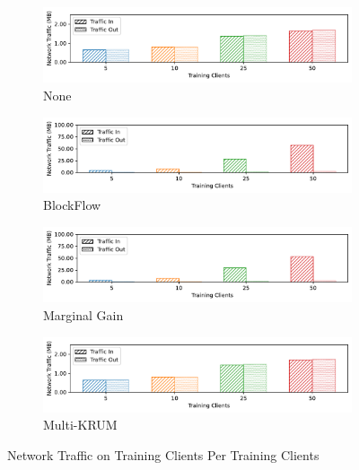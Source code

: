 \begin{figure}[!hp]
    \centering
    \begin{subfigure}[b]{0.49\textwidth}
        \centering
        \includegraphics[width=\textwidth]{graphics/clients/net_none_client.pdf}
        \caption{None}
    \end{subfigure}
    \hfill
    \begin{subfigure}[b]{0.49\textwidth}
        \centering
        \includegraphics[width=\textwidth]{graphics/clients/net_blockflow_client.pdf}
        \caption{BlockFlow}
    \end{subfigure}
    \hfill
    \begin{subfigure}[b]{0.49\textwidth}
        \centering
        \includegraphics[width=\textwidth]{graphics/clients/net_marginalgain_client.pdf}
        \caption{Marginal Gain}
    \end{subfigure}
    \hfill
    \begin{subfigure}[b]{0.49\textwidth}
        \centering
        \includegraphics[width=\textwidth]{graphics/clients/net_multikrum_client.pdf}
        \caption{Multi-KRUM}
    \end{subfigure}
    \caption{Network Traffic on Training Clients Per Training Clients}
    \label{fig:net_clients_degree_clients}
\end{figure}

